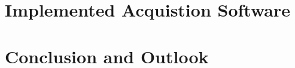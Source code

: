 \documentclass[aspectratio=169]{beamer}
\begin{document}
\section{Implemented Acquistion Software}

\section{Conclusion and Outlook}




% 
% 
% 
% 
% 
\end{document}
